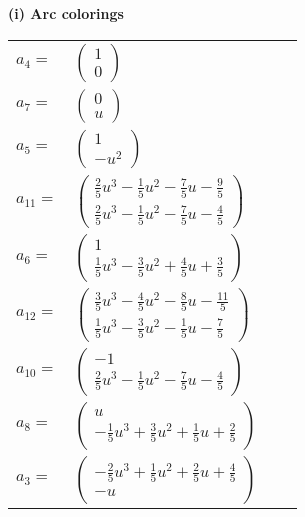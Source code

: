 \documentclass[1p]{elsarticle_modified}
\theoremstyle{definition}
\begin{document}
\flushleft \textbf{(i) Arc colorings}\\
\begin{tabular}{m{7pt} m{180pt} m{7pt} m{180pt} }
\flushright $a_{4}=$&$\begin{pmatrix}1\\0\end{pmatrix}$ \\
\flushright $a_{7}=$&$\begin{pmatrix}0\\u\end{pmatrix}$ \\
\flushright $a_{5}=$&$\begin{pmatrix}1\\- u^2\end{pmatrix}$ \\
\flushright $a_{11}=$&$\begin{pmatrix}\frac{2}{5} u^3-\frac{1}{5} u^2-\frac{7}{5} u-\frac{9}{5}\\\frac{2}{5} u^3-\frac{1}{5} u^2-\frac{7}{5} u-\frac{4}{5}\end{pmatrix}$ \\
\flushright $a_{6}=$&$\begin{pmatrix}1\\\frac{1}{5} u^3-\frac{3}{5} u^2+\frac{4}{5} u+\frac{3}{5}\end{pmatrix}$ \\
\flushright $a_{12}=$&$\begin{pmatrix}\frac{3}{5} u^3-\frac{4}{5} u^2-\frac{8}{5} u-\frac{11}{5}\\\frac{1}{5} u^3-\frac{3}{5} u^2-\frac{1}{5} u-\frac{7}{5}\end{pmatrix}$ \\
\flushright $a_{10}=$&$\begin{pmatrix}-1\\\frac{2}{5} u^3-\frac{1}{5} u^2-\frac{7}{5} u-\frac{4}{5}\end{pmatrix}$ \\
\flushright $a_{8}=$&$\begin{pmatrix}u\\-\frac{1}{5} u^3+\frac{3}{5} u^2+\frac{1}{5} u+\frac{2}{5}\end{pmatrix}$ \\
\flushright $a_{3}=$&$\begin{pmatrix}-\frac{2}{5} u^3+\frac{1}{5} u^2+\frac{2}{5} u+\frac{4}{5}\\- u\end{pmatrix}$ \\

\end{tabular}
\end{document}
